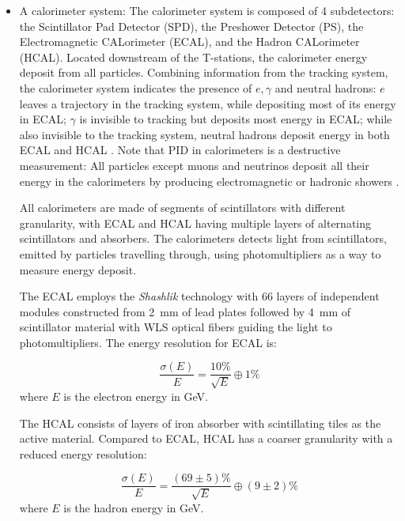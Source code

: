 \begin{itemize}
    \item A calorimeter system:
        The calorimeter system is composed of 4 subdetectors:
        the Scintillator Pad Detector (SPD), the Preshower Detector (PS),
        the Electromagnetic CALorimeter (ECAL),
        and the Hadron CALorimeter (HCAL).
        Located downstream of the T-stations, the calorimeter energy deposit
        from all particles.
        Combining information from the tracking system,
        the calorimeter system indicates the presence of $e, \gamma$ and neutral
        hadrons:
        $e$ leaves a trajectory in the tracking system, while depositing most
        of its energy in ECAL;
        $\gamma$ is invisible to tracking but deposits most energy in ECAL;
        while also invisible to the tracking system,
        neutral hadrons deposit energy in both ECAL and HCAL
        \cite{Belyaev_2021}.
        Note that PID in calorimeters is a destructive measurement:
        All particles except muons and neutrinos deposit all their energy
        in the calorimeters by producing electromagnetic or hadronic showers
        \cite{Lippmann_2012}.

        All calorimeters are made of segments of scintillators with different
        granularity,
        with ECAL and HCAL having multiple layers of alternating scintillators
        and absorbers.
        The calorimeters detects light from scintillators,
        emitted by particles travelling through,
        using photomultipliers as a way to measure energy deposit.

        The ECAL employs the \emph{Shashlik} technology with 66 layers of
        independent modules constructed from 2~mm of lead plates
        followed by 4~mm of scintillator material with WLS optical fibers
        guiding the light to photomultipliers.
        The energy resolution for ECAL is:

        \begin{equation}
            \frac{\sigma(E)}{E} = \frac{10\%}{\sqrt{E}} \oplus 1\%
        \end{equation}
        where $E$ is the electron energy in GeV.

        The HCAL consists of layers of iron absorber with scintillating tiles as
        the active material.
        Compared to ECAL, HCAL has a coarser granularity with a reduced
        energy resolution:

        \begin{equation}
            \frac{\sigma(E)}{E} = \frac{(69 \pm 5)\%}{\sqrt{E}} \oplus
            (9 \pm 2)\%
        \end{equation}
        where $E$ is the hadron energy in GeV.


\end{itemize}
